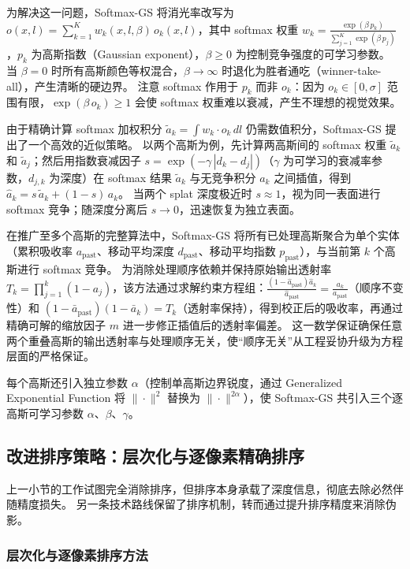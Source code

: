 为解决这一问题，Softmax-GS 将消光率改写为 $o(x,l) = \sum_{k=1}^K w_k(x,l,\beta)\,o_k(x,l)$，其中 softmax 权重 $w_k = \frac{\exp(\beta\,p_k)}{\sum_{j=1}^K \exp(\beta\,p_j)}$，$p_k$ 为高斯指数（Gaussian exponent），$\beta \geq 0$ 为控制竞争强度的可学习参数。
当 $\beta = 0$ 时所有高斯颜色等权混合，$\beta \to \infty$ 时退化为胜者通吃（winner-take-all），产生清晰的硬边界。
注意 softmax 作用于 $p_k$ 而非 $o_k$：因为 $o_k \in [0, \sigma]$ 范围有限，$\exp(\beta\,o_k) \geq 1$ 会使 softmax 权重难以衰减，产生不理想的视觉效果。

由于精确计算 softmax 加权积分 $\tilde{a}_k = \int w_k \cdot o_k\,dl$ 仍需数值积分，Softmax-GS 提出了一个高效的近似策略。
以两个高斯为例，先计算两高斯间的 softmax 权重 $\tilde{a}_k$ 和 $\tilde{a}_j$；然后用指数衰减因子 $s = \exp(-\gamma\,|d_k - d_j|)$（$\gamma$ 为可学习的衰减率参数，$d_{j,k}$ 为深度）在 softmax 结果 $\tilde{a}_k$ 与无竞争积分 $a_k$ 之间插值，得到 $\hat{a}_k = s\,\tilde{a}_k + (1-s)\,a_k$。
当两个 splat 深度极近时 $s \approx 1$，视为同一表面进行 softmax 竞争；随深度分离后 $s \to 0$，迅速恢复为独立表面。

在推广至多个高斯的完整算法中，Softmax-GS 将所有已处理高斯聚合为单个实体（累积吸收率 $a_{\text{past}}$、移动平均深度 $d_{\text{past}}$、移动平均指数 $p_{\text{past}}$），与当前第 $k$ 个高斯进行 softmax 竞争。
为消除处理顺序依赖并保持原始输出透射率 $T_k = \prod_{j=1}^k(1-a_j)$，该方法通过求解约束方程组：$\frac{(1-\hat{a}_{\text{past}})\hat{a}_k}{\hat{a}_{\text{past}}} = \frac{a_k}{a_{\text{past}}}$（顺序不变性）和 $(1-\bar{a}_{\text{past}})(1-\bar{a}_k) = T_k$（透射率保持），得到校正后的吸收率，再通过精确可解的缩放因子 $m$ 进一步修正插值后的透射率偏差。
这一数学保证确保任意两个重叠高斯的输出透射率与处理顺序无关，使“顺序无关”从工程妥协升级为方程层面的严格保证。

每个高斯还引入独立参数 $\alpha$（控制单高斯边界锐度，通过 Generalized Exponential Function 将 $\|\cdot\|^2$ 替换为 $\|\cdot\|^{2\alpha}$），使 Softmax-GS 共引入三个逐高斯可学习参数 $\alpha$、$\beta$、$\gamma$。

\subsection{改进排序策略：层次化与逐像素精确排序}

上一小节的工作试图完全消除排序，但排序本身承载了深度信息，彻底去除必然伴随精度损失。
另一条技术路线保留了排序机制，转而通过提升排序精度来消除伪影。

\subsubsection{层次化与逐像素排序方法}

